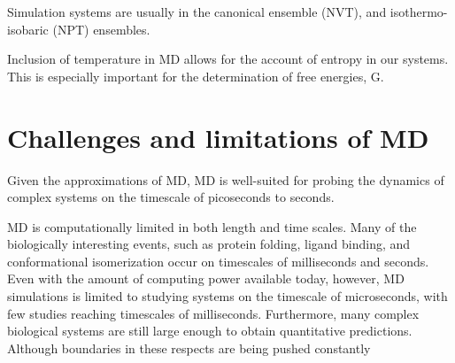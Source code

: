 Simulation systems are usually in the canonical ensemble (NVT), and isothermo-isobaric (NPT) ensembles.

Inclusion of temperature in MD allows for the account of entropy in our systems.  This is especially important for the determination of free energies, G. 





\section{Challenges and limitations of MD}

Given the approximations of MD, MD is well-suited for probing the dynamics of complex systems on the timescale of picoseconds to seconds.

MD is computationally limited in both length and time scales. Many of the biologically interesting events, such as protein folding, ligand binding, and conformational isomerization occur on timescales of milliseconds and seconds.  Even with the amount of computing power available today, however, MD simulations is limited to studying systems on the timescale of microseconds, with few studies reaching timescales of milliseconds. Furthermore, many complex biological systems are still large enough to obtain quantitative predictions. Although boundaries in these respects are being pushed constantly\cite{DE Shaw, Chris Neale, Sarah}

